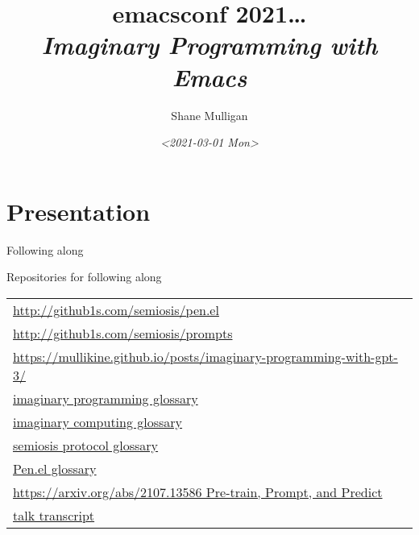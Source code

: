 \documentclass[presentation]{beamer}
\author{Shane Mulligan \\  }
\date{\textit{<2021-03-01 Mon>}}
\title{emacsconf 2021\ldots{} \\   \emph{\alert{Imaginary Programming with Emacs}} \\  }
\begin{document}
\maketitle

\section{Presentation}
\label{sec:org316ab70}
\begin{frame}[label={sec:orgb60978e}]{Following along}
\begin{block}{Repositories for following along}
{\tiny
\begin{center}
\begin{tabular}{l}
\url{http://github1s.com/semiosis/pen.el}\\
\url{http://github1s.com/semiosis/prompts}\\
\url{https://mullikine.github.io/posts/imaginary-programming-with-gpt-3/}\\
\href{http://github.com/semiosis/glossaries-gh/blob/master/imaginary-programming.txt}{imaginary programming glossary}\\
\href{http://github.com/semiosis/glossaries-gh/blob/master/imaginary-computing.txt}{imaginary computing glossary}\\
\href{http://github.com/semiosis/glossaries-gh/blob/master/semiosis-protocol.txt}{semiosis protocol glossary}\\
\href{http://github.com/semiosis/glossaries-gh/blob/master/pen.el.txt}{Pen.el glossary}\\
\href{https://arxiv.org/abs/2107.13586}{https://arxiv.org/abs/2107.13586 Pre-train, Prompt, and Predict}\\
\href{http://github1s.com/mullikine/imaginary-programming-transcript-emacsconf-2021}{talk transcript}\\
\end{tabular}
\end{center}
}
\end{block}
\end{frame}
\end{document}
